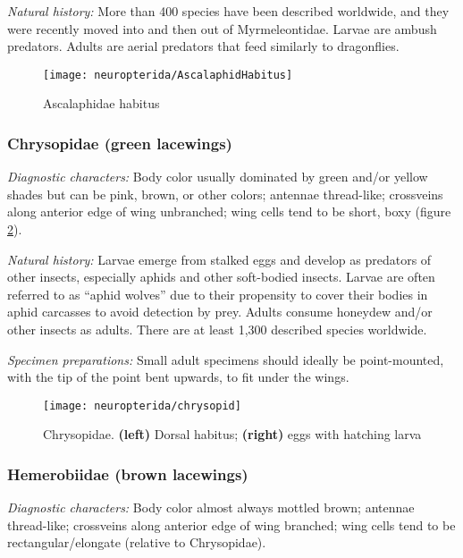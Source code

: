\noindent{}\textit{Natural history:} More than 400 species have been described worldwide, and they were recently moved into and then out of Myrmeleontidae. Larvae are ambush predators. Adults are aerial predators that feed similarly to dragonflies.\vspace{3mm}

\begin{figure}[ht!]
  \centering
    \texttt{[image: neuropterida/AscalaphidHabitus]}
  \caption{Ascalaphidae habitus \citep[modified from][Plate 99]{bhl33187}}
  \label{fig:ascalaph}
\end{figure}

\subsubsection{Chrysopidae (green lacewings)}
\noindent{}\textit{Diagnostic characters:} Body color usually dominated by green and/or yellow shades but can be pink, brown, or other colors; antennae thread-like; crossveins along anterior edge of wing unbranched; wing cells tend to be short, boxy (figure \ref{fig:chrysopids}).\vspace{3mm}

\noindent{}\textit{Natural history:} Larvae emerge from stalked eggs and develop as predators of other insects, especially aphids and other soft-bodied insects. Larvae are often referred to as ``aphid wolves'' due to their propensity to cover their bodies in aphid carcasses to avoid detection by prey. Adults consume honeydew and/or other insects as adults. There are at least 1,300 described species worldwide.\vspace{3mm}

\noindent{}\textit{Specimen preparations:} Small adult specimens should ideally be point-mounted, with the tip of the point bent upwards, to fit under the wings. \vspace{3mm}

\begin{figure}[ht!]
  \centering    \texttt{[image: neuropterida/chrysopid]}
  \caption{Chrysopidae. \textbf{(left)} Dorsal habitus; \textbf{(right)} eggs with hatching larva \citep[modified from][Plate 10, Figs. 1,4]{bhlitem53053}}
  \label{fig:chrysopids}
\end{figure}

\subsubsection{Hemerobiidae (brown lacewings)}
\noindent{}\textit{Diagnostic characters:} Body color almost always mottled brown; antennae thread-like; crossveins along anterior edge of wing branched; wing cells tend to be rectangular/elongate (relative to Chrysopidae).\vspace{3mm}

